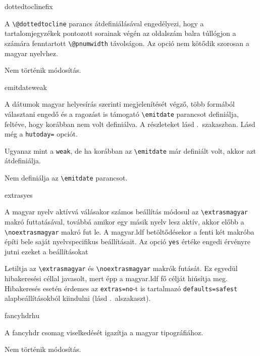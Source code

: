 \documentclass[12pt]{article}
\begin{document}
\begin{description}
\begin{hunopt}{dottedtocline}{fix}
\item[fix]
A \verb|\@dottedtocline| parancs átdefiniálásával engedélyezi, hogy a tartalomjegyzékek pontozott sorainak végén az oldalszám balra túllógjon a számára fenntartott \verb|\@pnumwidth| távolságon.
Az opció nem kötődik szorosan a magyar nyelvhez.
\item[unchanged]
Nem történik módosítás.
\end{hunopt}

\begin{hunopt}{emitdate}{weak}
\item[weak]
A dátumok magyar helyesírás szerinti megjelenítését végző, több formából választani engedő és a ragozást is támogató \verb|\emitdate| parancsot definiálja, feltéve, hogy korábban nem volt definiálva.
A részleteket lásd .~szakaszban.
Lásd még a \texttt{hutoday=} opciót.
\item[yes]
Ugyanaz mint a \texttt{weak}, de ha korábban az \verb|\emitdate| már definiált volt, akkor azt átdefiniálja.
\item[no]
Nem definiálja az \verb|\emitdate| parancsot.
\end{hunopt}

\begin{hunopt}{extras}{yes}
\item[yes]
A magyar nyelv aktívvá válásakor számos beállítás módosul az \verb|\extrasmagyar| makró futtatásával, továbbá amikor egy másik nyelv lesz aktív, akkor előbb a \verb|\noextrasmagyar| makró fut le.
A \textsf{magyar.ldf} betöltődésekor a fenti két makróba építi bele saját nyelvspecifikus beállításait.
Az opció \texttt{yes} értéke engedi érvényre jutni ezeket a beállításokat
\item[no]
Letiltja az \verb|\extrasmagyar| és \verb|\noextrasmagyar| makrók futását.
Ez egyedül hibakeresési céllal javasolt, mert épp a \textsf{magyar.ldf} fő célját hiúsítja meg.
Hibakeresés esetén érdemes az \texttt{extras=no}-t is tartalmazó \texttt{defaults=safest} alapbeállításokból kiindulni (lásd .~alszakaszt).
\end{hunopt}

\begin{hunopt}{fancyhdr}{hu}
\item[hu]
A \textsf{fancyhdr} csomag viselkedését igazítja a magyar tipográfiához.
\item[unchanged]
Nem történik módosítás.
\end{hunopt}


\end{description}
\end{document}

